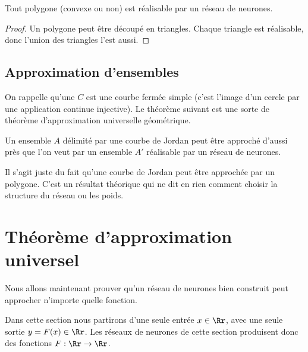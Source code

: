 \documentclass[11pt,class=report,crop=false]{standalone}
\begin{document}
\begin{proposition}
Tout polygone (convexe ou non) est réalisable par un réseau de neurones.
\end{proposition}

\begin{proof}
Un polygone peut être découpé en triangles. Chaque triangle est réalisable, donc l'union des triangles l'est aussi.



\end{proof}

\subsection{Approximation d'ensembles}



On rappelle qu'une  $C$ est une courbe fermée simple (c'est l'image d'un cercle par une application continue injective). Le théorème suivant est une sorte de théorème d'approximation universelle géométrique.

\begin{theoreme}
Un ensemble $A$ délimité par une courbe de Jordan peut être approché d'aussi près que l'on veut par un ensemble $A'$ réalisable par un réseau de neurones.
\end{theoreme}

Il s'agit juste du fait qu'une courbe de Jordan peut être approchée par un polygone.
C'est un résultat théorique qui ne dit en rien comment choisir la structure du réseau ou les poids.





\section{Théorème d'approximation universel}

Nous allons maintenant prouver qu'un réseau de neurones bien construit peut approcher n'importe quelle fonction. 

Dans cette section nous partirons d'une seule entrée $x \in \Rr$, avec une seule sortie $y = F(x) \in \Rr$. Les réseaux de neurones de cette section produisent donc des fonctions $F : \Rr \to \Rr$.
\end{document}
